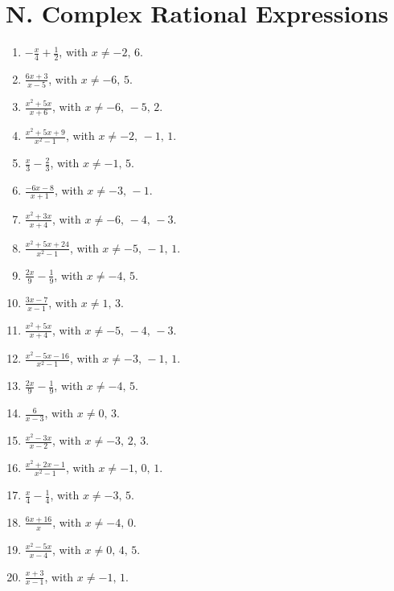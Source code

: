 \documentclass[11pt,oneside]{book}
\begin{document}
\section*{N. Complex Rational Expressions}
\begin{enumerate}[leftmargin=*,label=\textbf{N\arabic*.},itemsep=0.45\baselineskip]
\item $\displaystyle - \frac{x}{4} + \frac{1}{2}$, with $x\ne -2,\,6$.
\item $\displaystyle \frac{6 x + 3}{x - 5}$, with $x\ne -6,\,5$.
\item $\displaystyle \frac{x^{2} + 5 x}{x + 6}$, with $x\ne -6,\,-5,\,2$.
\item $\displaystyle \frac{x^{2} + 5 x + 9}{x^{2} - 1}$, with $x\ne -2,\,-1,\,1$.
\item $\displaystyle \frac{x}{3} - \frac{2}{3}$, with $x\ne -1,\,5$.
\item $\displaystyle \frac{- 6 x - 8}{x + 1}$, with $x\ne -3,\,-1$.
\item $\displaystyle \frac{x^{2} + 3 x}{x + 4}$, with $x\ne -6,\,-4,\,-3$.
\item $\displaystyle \frac{x^{2} + 5 x + 24}{x^{2} - 1}$, with $x\ne -5,\,-1,\,1$.
\item $\displaystyle \frac{2 x}{9} - \frac{1}{9}$, with $x\ne -4,\,5$.
\item $\displaystyle \frac{3 x - 7}{x - 1}$, with $x\ne 1,\,3$.
\item $\displaystyle \frac{x^{2} + 5 x}{x + 4}$, with $x\ne -5,\,-4,\,-3$.
\item $\displaystyle \frac{x^{2} - 5 x - 16}{x^{2} - 1}$, with $x\ne -3,\,-1,\,1$.
\item $\displaystyle \frac{2 x}{9} - \frac{1}{9}$, with $x\ne -4,\,5$.
\item $\displaystyle \frac{6}{x - 3}$, with $x\ne 0,\,3$.
\item $\displaystyle \frac{x^{2} - 3 x}{x - 2}$, with $x\ne -3,\,2,\,3$.
\item $\displaystyle \frac{x^{2} + 2 x - 1}{x^{2} - 1}$, with $x\ne -1,\,0,\,1$.
\item $\displaystyle \frac{x}{4} - \frac{1}{4}$, with $x\ne -3,\,5$.
\item $\displaystyle \frac{6 x + 16}{x}$, with $x\ne -4,\,0$.
\item $\displaystyle \frac{x^{2} - 5 x}{x - 4}$, with $x\ne 0,\,4,\,5$.
\item $\displaystyle \frac{x + 3}{x - 1}$, with $x\ne -1,\,1$.

\end{enumerate}
\end{document}
